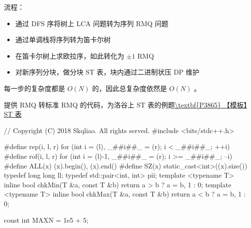 流程：

\begin{itemize}
\item 通过 DFS 序将树上 LCA 问题转为序列 RMQ 问题
\item 通过单调栈将序列转为笛卡尔树
\item 在笛卡尔树上求欧拉序，如此转化为 $\pm 1$ RMQ
\item 对新序列分块，做分块 ST 表，块内通过二进制状压 DP 维护
\end{itemize}

每一步的复杂度都是 $O(N)$ 的，因此总复杂度依然是 $O(N)$ 。

提供 RMQ 转标准 RMQ 的代码，为洛谷上 ST 表的例题\href{https://www.luogu.org/problemnew/show/P3865}{\textbackslash{}textbf\{P3865\} 【模板】ST 表}

\begin{cppcode}
// Copyright (C) 2018 Skqliao. All rights served.
#include <bits/stdc++.h>

#define rep(i, l, r) for (int i = (l), _##i##_ = (r); i < _##i##_; ++i)
#define rof(i, l, r) for (int i = (l)-1, _##i##_ = (r); i >= _##i##_; --i)
#define ALL(x) (x).begin(), (x).end()
#define SZ(x) static_cast<int>((x).size())
typedef long long ll;
typedef std::pair<int, int> pii;
template <typename T>
inline bool chkMin(T &a, const T &b) {
  return a > b ? a = b, 1 : 0;
}
template <typename T>
inline bool chkMax(T &a, const T &b) {
  return a < b ? a = b, 1 : 0;
}

const int MAXN = 1e5 + 5;


\end{cppcode}
